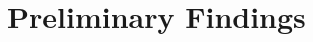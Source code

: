\documentclass[../main.tex]{subfiles}
\begin{document}
  \section{Preliminary Findings}
\end{document}
